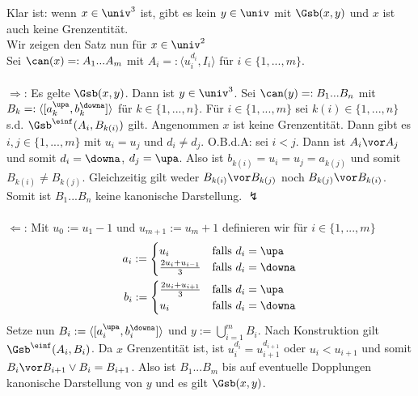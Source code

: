 \begin{bew}
    Klar ist: wenn $x \in \univ^3$ ist, gibt es kein $y \in \univ$ mit $\Gsb(x,y)$ und $x$ ist auch keine Grenzentität.\\
    Wir zeigen den Satz nun für $x \in \univ^2$\\
    Sei $\can(x) =: A_1 ... A_m$ mit $A_i =: \langle u_i^{d_i}, I_i \rangle$ für $i \in \{1, ..., m\}$.\\ \ \\
    $\boldsymbol{\Rightarrow}$: 
    Es gelte $\Gsb(x,y)$.
    Dann ist $y \in \univ^3$.
    Sei $\can(y) =: B_1 ... B_n$ mit $B_k =: \langle [a_k^\upa,b_k^\downa] \rangle$ für $k \in \{1, ..., n\}$.
    Für $i \in \{1, ..., m\}$ sei $k(i) \in \{1, ..., n\}$ s.d. $\Gsb^\einf(A_i,B_{k(i)})$ gilt.
    Angenommen $x$ ist keine Grenzentität.
    Dann gibt es $i,j \in \{1, ..., m\}$ mit $u_i = u_j$ und $d_i \neq d_j$. O.B.d.A: sei $i<j$. Dann ist $A_i \vor A_j$ und somit $d_i = \downa$, $d_j = \upa$.
    Also ist $b_{k(i)} = u_i = u_j = a_{k(j)}$ und somit $B_{k(i)} \neq B_{k(j)}$. Gleichzeitig gilt weder $B_{k(i)} \vor B_{k(j)}$ noch $B_{k(j)} \vor B_{k(i)}$. 
    Somit ist $B_1 ... B_n$ keine kanonische Darstellung. $\lightning$\\ \ \\
    $\boldsymbol{\Leftarrow}$:
    Mit $u_0 := u_1-1$ und $u_{m+1} := u_m+1$ definieren wir für $i \in \{1, ..., m\}$
    \begin{align*}
        a_i := 
            \begin{cases}
                u_i & \text{falls $d_i = \upa$}\\
                \frac{2u_i + u_{i-1}}{3} & \text{falls $d_i = \downa$}
            \end{cases}\\
        b_i := 
            \begin{cases}
                \frac{2u_i + u_{i+1}}{3} & \text{falls $d_i = \upa$}\\
                u_i & \text{falls $d_i = \downa$}
            \end{cases}
    \end{align*}
    Setze nun $B_i := \langle [a_i^\upa, b_i^\downa] \rangle$ und $y := \bigcup_{i=1}^m B_i$.
    Nach Konstruktion gilt $\Gsb^\einf(A_i, B_i)$.
    Da $x$ Grenzentität ist, ist $u_{i}^{d_i} = u_{i+1}^{d_{i+1}}$ oder $u_i < u_{i+1}$ und somit   $B_i \vor B_{i+1} \lor B_i = B_{i+1}$.
    Also ist $B_1 ... B_m$ bis auf eventuelle Dopplungen kanonische Darstellung von $y$ und es gilt $\Gsb(x,y)$.\\ \ \\

\end{bew}
